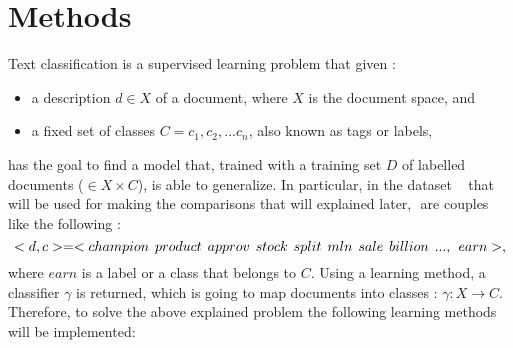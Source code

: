 \section{Methods}
Text classification is a supervised learning problem that given :
\begin{itemize}
    \item a description \( d \in X \) of a document, where \(X\) is the document space, and
    \item a fixed set of classes \(C = {c_1,c_2,...c_n}\), also known as tags or labels, 
\end{itemize}
has the goal to find a model that, trained with a training set \(D\) of labelled documents (\(<d,c> \in X \times C\)), is able to generalize.
In particular, in the dataset ~\cite{dataset-r8r52ohsumed} that will be used for making the comparisons that will explained later, \(<d,c>\) are couples like the following : 
\begin{equation}
    <d,c> = <champion\hspace{0.15cm}product\hspace{0.15cm}approv\hspace{0.15cm}stock\hspace{0.15cm}split\hspace{0.15cm}mln\hspace{0.15cm}sale\hspace{0.15cm}billion\hspace{0.15cm}...,\hspace{0.15cm}earn>,
\end{equation}
where $earn$ is a label or a class that belongs to \(C\).
Using a learning method, a classifier \(\gamma\) is returned, which is going to map documents into classes : \(\gamma : X \rightarrow C\).
\newline
Therefore, to solve the above explained problem the following learning methods~\cite{paper-text-classification-algorithms} will be implemented:
